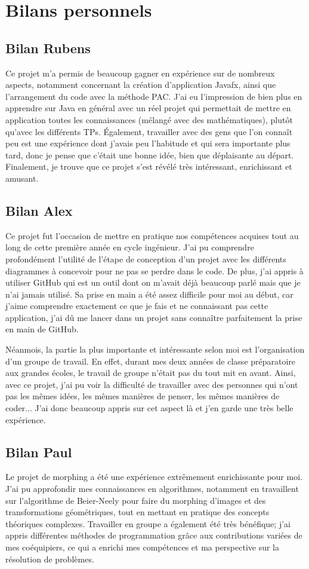 \section{Bilans personnels}
\subsection{Bilan Rubens}

Ce projet m'a permis de beaucoup gagner en expérience sur de nombreux aspects, notamment concernant la création d'application Javafx, ainsi que l'arrangement du code avec la méthode PAC. J'ai eu l'impression de bien plus en apprendre sur Java en général avec un réel projet qui permettait de mettre en application toutes les connaissances (mélangé avec des mathématiques), plutôt qu'avec les différents TPs. Également, travailler avec des gens que l'on connaît peu est une expérience dont j'avais peu l'habitude et qui sera importante plus tard, donc je pense que c'était une bonne idée, bien que déplaisante au départ. 
Finalement, je trouve que ce projet s'est révélé très intéressant, enrichissant et amusant.
\subsection{Bilan Alex}

Ce projet fut l'occasion de mettre en pratique nos compétences acquises tout au long de cette première année en cycle ingénieur. J'ai pu comprendre profondément l'utilité de l'étape de conception d'un projet avec les différents diagrammes à concevoir pour ne pas se perdre dans le code. De plus, j'ai appris à utiliser GitHub qui est un outil dont on m'avait déjà beaucoup parlé mais que je n'ai jamais utilisé. Sa prise en main a été assez difficile pour moi au début, car j'aime comprendre exactement ce que je fais et ne connaissant pas cette application, j'ai dû me lancer dans un projet sans connaître parfaitement la prise en main de GitHub.

Néanmois, la partie la plus importante et intéressante selon moi est l'organisation d'un groupe de travail. En effet, durant mes deux années de classe préparatoire aux grandes écoles, le travail de groupe n'était pas du tout mit en avant. Ainsi, avec ce projet, j'ai pu voir la difficulté de travailler avec des personnes qui n'ont pas les mêmes idées, les mêmes manières de penser, les mêmes manières de coder... J'ai donc beaucoup appris sur cet aspect là et j'en garde une très belle expérience.


\subsection{Bilan Paul}
Le projet de morphing a été une expérience extrêmement enrichissante pour moi. J'ai pu approfondir mes connaissances en algorithmes, notamment en travaillent sur l'algorithme de Beier-Neely pour faire du morphing d'images et des transformations géométriques, tout en mettant en pratique des concepts théoriques complexes. Travailler en groupe a également été très bénéfique; j'ai appris différentes méthodes de programmation grâce aux contributions variées de mes coéquipiers, ce qui a enrichi mes compétences et ma perspective sur la résolution de problèmes.

